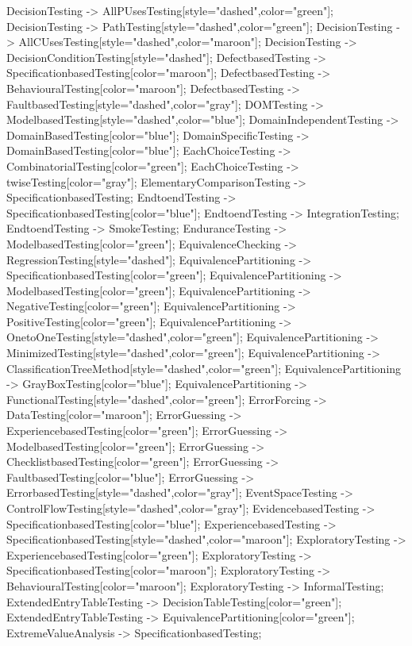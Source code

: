 \documentclass{article}
\begin{document}
{DecisionTesting -> AllPUsesTesting[style="dashed",color="green"];
DecisionTesting -> PathTesting[style="dashed",color="green"];
DecisionTesting -> AllCUsesTesting[style="dashed",color="maroon"];
DecisionTesting -> DecisionConditionTesting[style="dashed"];
DefectbasedTesting -> SpecificationbasedTesting[color="maroon"];
DefectbasedTesting -> BehaviouralTesting[color="maroon"];
DefectbasedTesting -> FaultbasedTesting[style="dashed",color="gray"];
DOMTesting -> ModelbasedTesting[style="dashed",color="blue"];
DomainIndependentTesting -> DomainBasedTesting[color="blue"];
DomainSpecificTesting -> DomainBasedTesting[color="blue"];
EachChoiceTesting -> CombinatorialTesting[color="green"];
EachChoiceTesting -> twiseTesting[color="gray"];
ElementaryComparisonTesting -> SpecificationbasedTesting;
EndtoendTesting -> SpecificationbasedTesting[color="blue"];
EndtoendTesting -> IntegrationTesting;
EndtoendTesting -> SmokeTesting;
EnduranceTesting -> ModelbasedTesting[color="green"];
EquivalenceChecking -> RegressionTesting[style="dashed"];
EquivalencePartitioning -> SpecificationbasedTesting[color="green"];
EquivalencePartitioning -> ModelbasedTesting[color="green"];
EquivalencePartitioning -> NegativeTesting[color="green"];
EquivalencePartitioning -> PositiveTesting[color="green"];
EquivalencePartitioning -> OnetoOneTesting[style="dashed",color="green"];
EquivalencePartitioning -> MinimizedTesting[style="dashed",color="green"];
EquivalencePartitioning -> ClassificationTreeMethod[style="dashed",color="green"];
EquivalencePartitioning -> GrayBoxTesting[color="blue"];
EquivalencePartitioning -> FunctionalTesting[style="dashed",color="green"];
ErrorForcing -> DataTesting[color="maroon"];
ErrorGuessing -> ExperiencebasedTesting[color="green"];
ErrorGuessing -> ModelbasedTesting[color="green"];
ErrorGuessing -> ChecklistbasedTesting[color="green"];
ErrorGuessing -> FaultbasedTesting[color="blue"];
ErrorGuessing -> ErrorbasedTesting[style="dashed",color="gray"];
EventSpaceTesting -> ControlFlowTesting[style="dashed",color="gray"];
EvidencebasedTesting -> SpecificationbasedTesting[color="blue"];
ExperiencebasedTesting -> SpecificationbasedTesting[style="dashed",color="maroon"];
ExploratoryTesting -> ExperiencebasedTesting[color="green"];
ExploratoryTesting -> SpecificationbasedTesting[color="maroon"];
ExploratoryTesting -> BehaviouralTesting[color="maroon"];
ExploratoryTesting -> InformalTesting;
ExtendedEntryTableTesting -> DecisionTableTesting[color="green"];
ExtendedEntryTableTesting -> EquivalencePartitioning[color="green"];
ExtremeValueAnalysis -> SpecificationbasedTesting;
}
\end{document}
